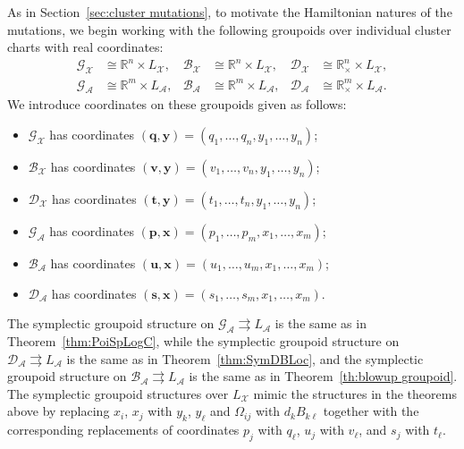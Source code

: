 \documentclass{amsart}
\numberwithin{equation}{section}
\newcommand{\bfp}{{\boldsymbol{p}}}
\newcommand{\bfq}{{\boldsymbol{q}}}
\newcommand{\bfs}{{\boldsymbol{s}}}
\newcommand{\bft}{{\boldsymbol{t}}}
\newcommand{\bfu}{{\boldsymbol{u}}}
\newcommand{\bfv}{{\boldsymbol{v}}}
\newcommand{\bfx}{{\boldsymbol{x}}}
\newcommand{\bfy}{{\boldsymbol{y}}}
\newcommand{\cA}{\mathcal{A}}
\newcommand{\cB}{\mathcal{B}}
\newcommand{\cD}{\mathcal{D}}
\newcommand{\cG}{\mathcal{G}}
\newcommand{\cX}{\mathcal{X}}
\newcommand{\RR}{\mathbb{R}}
\newcommand{\rra}{\rightrightarrows}
\begin{document}
As in Section~\ref{sec:cluster mutations}, to motivate the Hamiltonian natures of the mutations, we begin working with the following groupoids over individual cluster charts with real coordinates: 
\begin{align*}
  \cG_\cX&\cong\RR^n\times L_\cX,& \cB_\cX&\cong\RR^n\times L_\cX,& \cD_\cX&\cong\RR_\times^n\times L_\cX,\\
  \cG_\cA&\cong\RR^m\times L_\cA,& \cB_\cA&\cong\RR^m\times L_\cA,& \cD_\cA&\cong\RR_\times^m\times L_\cA.
\end{align*}
We introduce coordinates on these groupoids given as follows:
\begin{itemize}
  \item $\cG_\cX$ has coordinates $(\bfq,\bfy)=(q_1,\ldots,q_n,y_1,\ldots,y_n)$; 
  \item $\cB_\cX$ has coordinates $(\bfv,\bfy)=(v_1,\ldots,v_n,y_1,\ldots,y_n)$;
  \item $\cD_\cX$ has coordinates $(\bft,\bfy)=(t_1,\ldots,t_n,y_1,\ldots,y_n)$; 
  \item $\cG_\cA$ has coordinates $(\bfp,\bfx)=(p_1,\ldots,p_m,x_1,\ldots,x_m)$; 
  \item $\cB_\cA$ has coordinates $(\bfu,\bfx)=(u_1,\ldots,u_m,x_1,\ldots,x_m)$;
  \item $\cD_\cA$ has coordinates $(\bfs,\bfx)=(s_1,\ldots,s_m,x_1,\ldots,x_m)$.
\end{itemize}
The symplectic groupoid structure on $\cG_\cA \rra L_\cA$ is the same as in Theorem~\ref{thm:PoiSpLogC}, while the symplectic groupoid structure on $\cD_\cA \rra L_\cA$ is the same as in Theorem~\ref{thm:SymDBLoc}, and the symplectic groupoid structure on $\cB_\cA \rra L_\cA$ is the same as in Theorem~\ref{th:blowup groupoid}.
The symplectic groupoid structures over $L_\cX$ mimic the structures in the theorems above by replacing $x_i$, $x_j$ with $y_k$, $y_\ell$ and $\Omega_{ij}$ with $d_kB_{k\ell}$ together with the corresponding replacements of coordinates $p_j$ with $q_\ell$, $u_j$ with $v_\ell$, and $s_j$ with $t_\ell$.
\end{document}
